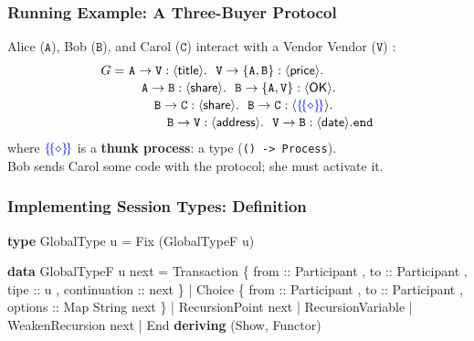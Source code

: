 \documentclass[12pt]{beamer}
\newenvironment{Shaded}{}{}
\newcommand{\KeywordTok}[1]{\textcolor[rgb]{0.00,0.44,0.13}{\textbf{#1}}}
\newcommand{\DataTypeTok}[1]{\textcolor[rgb]{0.56,0.13,0.00}{#1}}
\newcommand{\OtherTok}[1]{\textcolor[rgb]{0.00,0.44,0.13}{#1}}
\newcommand{\FunctionTok}[1]{\textcolor[rgb]{0.02,0.16,0.49}{#1}}
\newcommand{\NormalTok}[1]{#1}
\begin{document}
\begin{frame}[fragile]
\frametitle{Running Example: A Three-Buyer Protocol}

Alice ($\mathtt{A}$), Bob ($\mathtt{B}$), and Carol ($\mathtt{C}$) interact with a Vendor Vendor ($\mathtt{V}$) :
\begin{align*}
G = ~&  \mathtt{A}\to\mathtt{\texttt{V}}:\langle \mathsf{title}\rangle.~~\mathtt{\mathtt{V}}\to\mathtt{\{A,B\}}:\langle \mathsf{price}\rangle.\\[-0.5mm] 
 & \quad\mathtt{A}\to\mathtt{B}:\langle \mathsf{share}\rangle.~~\mathtt{B}\to\mathtt{\{A,\mathtt{V}\}}:\langle \mathsf{OK}\rangle.
 \\[-0.5mm]
 & \quad\quad \mathtt{B}\to\mathtt{C}:\langle \mathsf{share}\rangle.~~\mathtt{B}\to\mathtt{C}:\langle \textcolor{blue}{\{\!\{\diamond\}\!\}}\rangle.
 \\[-0.5mm]
 & \quad\qquad \mathtt{B}\to\mathtt{\mathtt{V}}:\langle \mathsf{address}\rangle.~~\mathtt{\mathtt{V}}\to\mathtt{B}:\langle \mathsf{date}\rangle.\mathtt{end}
\end{align*}
where $\textcolor{blue}{\{\!\{\diamond\}\!\}}$ is a \textbf{thunk process}: a type (\texttt{() -> Process}).  \\
Bob sends Carol some code with the protocol; she must activate it.

\end{frame}

\begin{frame}[fragile]
\frametitle{Implementing Session Types: Definition}

\begin{Shaded}
\begin{Highlighting}[]
\KeywordTok{type} \DataTypeTok{GlobalType}\NormalTok{ u }\FunctionTok{=} \DataTypeTok{Fix}\NormalTok{ (}\DataTypeTok{GlobalTypeF}\NormalTok{ u)}

\KeywordTok{data} \DataTypeTok{GlobalTypeF}\NormalTok{ u next}
    \FunctionTok{=} \DataTypeTok{Transaction} 
\NormalTok{        \{}\OtherTok{ from ::} \DataTypeTok{Participant}
\NormalTok{        ,}\OtherTok{ to ::} \DataTypeTok{Participant}
\NormalTok{        ,}\OtherTok{ tipe ::}\NormalTok{ u}
\NormalTok{        ,}\OtherTok{ continuation ::}\NormalTok{  next }
\NormalTok{        \} }
    \FunctionTok{|} \DataTypeTok{Choice} 
\NormalTok{        \{}\OtherTok{ from ::} \DataTypeTok{Participant}
\NormalTok{        ,}\OtherTok{ to ::} \DataTypeTok{Participant}
\NormalTok{        ,}\OtherTok{ options ::} \DataTypeTok{Map} \DataTypeTok{String}\NormalTok{ next }
\NormalTok{        \}}
    \FunctionTok{|} \DataTypeTok{RecursionPoint}\NormalTok{ next}
    \FunctionTok{|} \DataTypeTok{RecursionVariable}
    \FunctionTok{|} \DataTypeTok{WeakenRecursion}\NormalTok{ next}
    \FunctionTok{|} \DataTypeTok{End}
    \KeywordTok{deriving}\NormalTok{ (}\DataTypeTok{Show}\NormalTok{, }\DataTypeTok{Functor}\NormalTok{)}
\end{Highlighting}
\end{Shaded}
\end{frame}
\end{document}
